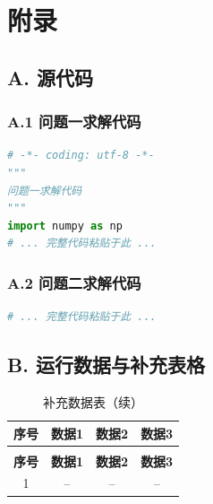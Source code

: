
\appendix
\section*{附录}

\subsection*{A. 源代码}


\subsubsection*{A.1 问题一求解代码}

\begin{lstlisting}[language=Python, caption={问题一求解代码 (question1\_solve.py)}]
# -*- coding: utf-8 -*-
"""
问题一求解代码
"""
import numpy as np
# ... 完整代码粘贴于此 ...
\end{lstlisting}

\subsubsection*{A.2 问题二求解代码}

\begin{lstlisting}[language=Python, caption={问题二求解代码 (question2\_solve.py)}]
# ... 完整代码粘贴于此 ...
\end{lstlisting}

\subsection*{B. 运行数据与补充表格}


\begin{longtable}{cccc}
  \caption{补充数据表} \\
  \toprule
  \textbf{序号} & \textbf{数据1} & \textbf{数据2} & \textbf{数据3} \\
  \midrule
  \endfirsthead
  \caption{补充数据表（续）} \\
  \toprule
  \textbf{序号} & \textbf{数据1} & \textbf{数据2} & \textbf{数据3} \\
  \midrule
  \endhead
  \bottomrule
  \endfoot

  1 & -- & -- & -- \\
\end{longtable}
